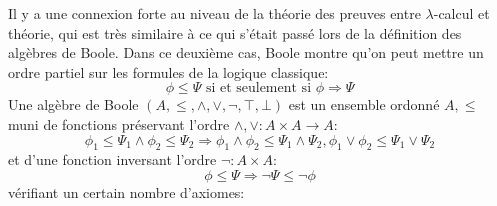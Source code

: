\documentclass[math, info]{cours}
\begin{document}
Il y a une connexion forte au niveau de la théorie des preuves entre $\lambda$-calcul et théorie, qui est très similaire à ce qui s'était passé lors de la définition des algèbres de Boole.
Dans ce deuxième cas, Boole montre qu'on peut mettre un ordre partiel sur les formules de la logique classique:
\begin{equation*}
	\phi \leq \Psi \text{ si et seulement si } \phi \Rightarrow \Psi
\end{equation*}
Une algèbre de Boole $(A, \leq, \land, \lor, \lnot, \top, \bot)$ est un ensemble ordonné $A, \leq$ muni de fonctions préservant l'ordre $\land, \lor: A\times A \to A$:
\begin{equation*}
	\phi_{1} \leq \Psi_{1} \land \phi_{2} \leq \Psi_{2} \Longrightarrow \phi_{1} \land \phi_{2} \leq \Psi_{1}\land \Psi_{2}, \phi_{1} \lor \phi_{2} \leq \Psi_{1}\lor \Psi_{2}
\end{equation*}
et d'une fonction inversant l'ordre $\lnot: A \times A$:
\begin{equation*}
	\phi \leq \Psi \Rightarrow \lnot \Psi \leq \lnot \phi
\end{equation*}
vérifiant un certain nombre d'axiomes:
\end{document}
